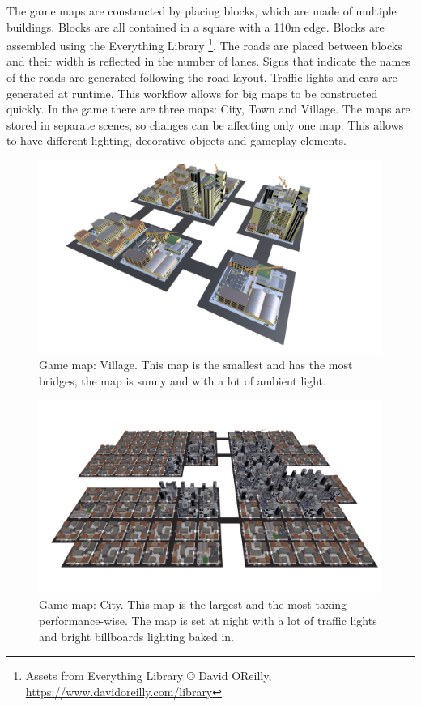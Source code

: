 \documentclass[12pt]{article}
\begin{document}
The game maps are constructed by placing blocks, which are made of multiple buildings. Blocks are all contained in a square with a 110m edge. Blocks are assembled using the Everything Library \footnote{Assets from Everything Library © David OReilly, \url{https://www.davidoreilly.com/library}}. The roads are placed between blocks and their width is reflected in the number of lanes. Signs that indicate the names of the roads are generated following the road layout. Traffic lights and cars are generated at runtime. This workflow allows for big maps to be constructed quickly. In the game there are three maps: City, Town and Village. The maps are stored in separate scenes, so changes can be affecting only one map. This allows to have different lighting, decorative objects and gameplay elements.

\begin{figure}[H]
\includegraphics[width=\textwidth]{map_village}
\caption{Game map: Village. This map is the smallest and has the most bridges, the map is sunny and with a lot of ambient light.}
\end{figure}

\begin{figure}[H]
\includegraphics[width=\textwidth]{map_city}
\caption{Game map: City. This map is the largest and the most taxing performance-wise. The map is set at night with a lot of traffic lights and bright billboards lighting baked in.}
\end{figure}
\end{document}
